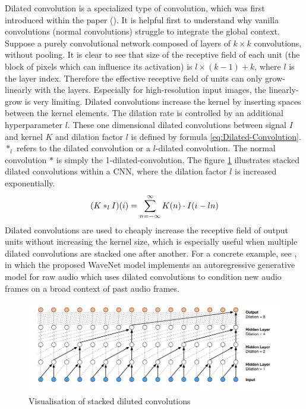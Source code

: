 Dilated convolution is a specialized type of convolution, which was first introduced within the paper (\cite{yu_multi-scale_2016}). It is helpful first to understand why vanilla convolutions (normal convolutions) struggle to integrate the global context. Suppose a purely convolutional network composed of layers of $k \times k$ convolutions, without pooling. It is clear to see that size of the receptive field of each unit (the block of pixels which can influence its activation) is $l \times (k-1) + k$, where $l$ is the layer index. Therefore the effective receptive field of units can only grow-linearly with the layers. Especially for high-resolution input images, the linearly-grow is very limiting.
\newline
\newline
Dilated convolutions increase the kernel by inserting spaces between the kernel elements. The dilation rate is controlled by an additional hyperparameter $l$. These one dimensional dilated convolutions between signal $I$ and kernel $K$ and dilation factor $l$ is defined by formula \ref{eq:Dilated-Convolution}. $\ast_l$ refers to the dilated convolution or a $l$-dilated convolution. The normal convolution $\ast$ is simply the 1-dilated-convolution. The figure \ref{fig:Dilated-Convolution} illustrates stacked dilated convolutions within a \gls{CNN}, where the dilation factor $l$ is increased exponentially.
\begin{equation}
    \centering
    (K \ast_l I)(i) = \sum_{n=-\infty}^\infty K(n) \cdot I(i - ln)
    \label{eq:Dilated-Convolution}
\end{equation}
Dilated convolutions are used to cheaply increase the receptive field of output units without increasing the kernel size, which is especially useful when multiple dilated convolutions are stacked one after another. For a concrete example, see \cite{oord_wavenet_2016}, in which the proposed WaveNet model implements an autoregressive generative model for raw audio which uses dilated convolutions to condition new audio frames on a broad context of past audio frames.

\begin{figure}[htbp]
	\centering
	\includegraphics[scale=0.9]{baa-documentation/img/Dilated_Colvolution.png}
	\caption[SINS database recording environment map]{Visualisation of stacked diluted convolutions \footnotemark}
	\label{fig:Dilated-Convolution}
\end{figure}

